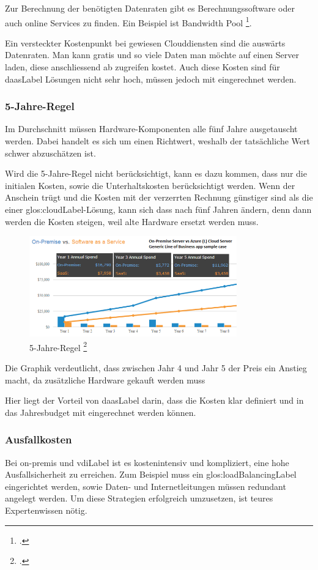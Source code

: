 Zur Berechnung der benötigten Datenraten gibt es Berechnungssoftware oder auch online Services zu finden. Ein Beispiel ist Bandwidth Pool \footcite{What_is_Bandwidth_Pool_Bandwidth_Pool}.

Ein versteckter Kostenpunkt bei gewiesen Clouddiensten sind die auswärts Datenraten. Man kann gratis und so viele Daten man möchte auf einen Server laden, diese anschliessend ab zugreifen kostet.
Auch diese Kosten sind für \Gls{daasLabel} Lösungen nicht sehr hoch, müssen jedoch mit eingerechnet werden.

\subsubsection{5-Jahre-Regel}
Im Durchschnitt müssen Hardware-Komponenten alle fünf Jahre ausgetauscht werden. Dabei handelt es sich um einen Richtwert, weshalb der tatsächliche Wert schwer abzuschätzen ist.

Wird die 5-Jahre-Regel nicht berücksichtigt, kann es dazu kommen, dass nur die initialen Kosten, sowie die Unterhaltskosten berücksichtigt werden.
Wenn der Anschein trügt und die Kosten mit der verzerrten Rechnung günstiger sind als die einer \Gls{glos:cloudLabel}-Lösung, kann sich dass nach fünf Jahren ändern, denn dann werden die Kosten steigen, weil alte Hardware ersetzt werden muss.

\begin{figure}[H]
	\includegraphics[width=0.8\textwidth]{images/five-year-rule}
	\caption{5-Jahre-Regel \footcite{Comparing_cloud_vs_on-premise_Six_hidden_costs_people_always_forget_about}}
	\label{fig:fiveYearRuleImage}
\end{figure}
Die Graphik verdeutlicht, dass zwischen Jahr 4 und Jahr 5 der Preis ein Anstieg macht, da zusätzliche Hardware gekauft werden muss

Hier liegt der Vorteil von \Gls{daasLabel} darin, dass die Kosten klar definiert und in das Jahresbudget mit eingerechnet werden können.

\subsubsection{Ausfallkosten}
Bei on-premis und \Gls{vdiLabel} ist es kostenintensiv und kompliziert, eine hohe Ausfallsicherheit zu erreichen. Zum Beispiel muss ein \gls{glos:loadBalancingLabel} eingerichtet werden, sowie Daten- und Internetleitungen müssen redundant angelegt werden. Um diese Strategien erfolgreich umzusetzen, ist teures Expertenwissen nötig.


